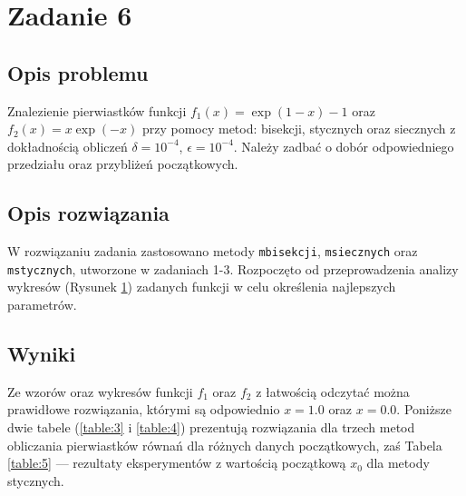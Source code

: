 \documentclass{classrep}
\begin{document}
\section{Zadanie 6}
	\subsection{Opis problemu}
		Znalezienie pierwiastków funkcji $f_1(x)=\exp(1-x)-1$ oraz $f_2(x)=x\exp(-x)$ przy pomocy metod: bisekcji, stycznych oraz siecznych z dokładnością obliczeń $\delta=10^{-4}$, $\epsilon=10^{-4}$. Należy zadbać o dobór odpowiedniego przedziału oraz przybliżeń początkowych.
		
	\subsection{Opis rozwiązania}
		W rozwiązaniu zadania zastosowano metody \texttt{mbisekcji}, \texttt{msiecznych} oraz \texttt{mstycznych}, utworzone w zadaniach 1-3.
		Rozpoczęto od przeprowadzenia analizy wykresów (Rysunek \ref{fig:2}) zadanych funkcji w celu określenia najlepszych parametrów.
		
		\begin{figure}[!htbp]
			\centering
			 \hfill
  			\caption{}
  			\label{fig:2}
		\end{figure}		
		
	\subsection{Wyniki}
			Ze wzorów oraz wykresów funkcji $f_1$ oraz $f_2$ z łatwością odczytać można prawidłowe rozwiązania, którymi są odpowiednio $x=1.0$ oraz $x=0.0$. Poniższe dwie tabele (\ref{table:3} i \ref{table:4}) prezentują rozwiązania dla trzech metod obliczania pierwiastków równań dla różnych danych początkowych, zaś Tabela \ref{table:5} --- rezultaty eksperymentów z wartością początkową $x_0$ dla metody stycznych.
\end{document}
